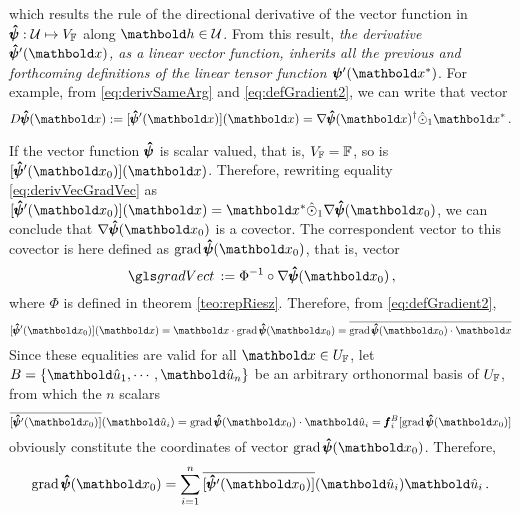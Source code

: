 which results the rule of the directional derivative of the vector function in $\pmb{\hat\psi} : \mathcal{U} \mapsto V_{\mathbb{F}}$ along $\vto{h}\in\mathcal{U}$. From this result, \emph{the derivative $\tnr{\hat\psi}'(\vto{x})$, as a linear vector function, inherits all the previous and forthcoming definitions of the linear tensor function $\fua{\tnr{\psi}'}{\vto{x}^*}$}. For example, from \eqref{eq:derivSameArg} and \eqref{eq:defGradient2}, we can write that vector
\begin{equation}\label{eq:derivSameArg2}
\fua{D\tnr{\hat\psi}}{\vto{x}} := \fua{[\tnr{\hat\psi}'(\vto{x})]}{\vto{x}}=\fua{ \nabla\tnr{\hat{\psi}}}{\vto{x}}^\dagger\hat{\odot}_1\vto{x}^*\,.
\end{equation}


If the vector function $\pmb{\hat\psi}$ is scalar valued, that is, $V_{\mathbb{F}}=\mathbb{F}$, so is $\fua{[\tnr{\hat\psi}'(\vto{x}_0)]}{\vto{x}}$. Therefore, rewriting equality \eqref{eq:derivVecGradVec} as $\fua{[\tnr{\hat\psi}'(\vto{x}_0)]}{\vto{x}} = \vto{x}^*\hat{\odot}_1\fua{ \nabla\tnr{\hat{\psi}}}{\vto{x}_0}$, we can conclude that $\fua{\nabla\tnr{\hat{\psi}}}{\vto{x}_0}$ is a covector. The correspondent vector to this covector is here defined as $\fua{\grad{\tnr{\hat{\psi}}}}{\vto{x}_0}$, that is, vector      
\begin{equation}
\gloref{gradVect}:=\Phi^{-1}\circ\fua{\nabla\tnr{\hat{\psi}}}{\vto{x}_0}\,,
\end{equation}
where $\Phi$ is defined in theorem \ref{teo:repRiesz}. Therefore, from \eqref{eq:defGradient2},
\begin{equation}\label{eq:gradScalVectFunc}
\fua{[\tnr{\hat\psi}'(\vto{x}_0)]}{\vto{x}} = \vto{x}\cdot\fua{\grad{\tnr{\hat{\psi}}}}{\vto{x}_0}=\overline{\fua{\grad{\tnr{\hat{\psi}}}}{\vto{x}_0}\cdot\vto{x}}
\end{equation}
Since these equalities are valid for all $\vto{x}\in U_\cam{F}$, let $B=\{\vun{u}_1,\cdots,\vun{u}_n\}$ be an arbitrary orthonormal basis of $U_{\mathbb{F}}$, from which the $n$ scalars
\begin{equation*}
\fua{\overline{[\tnr{\hat\psi}'(\vto{x}_0)]}}{\vun{u}_i} = \fua{\grad{\tnr{\hat{\psi}}}}{\vto{x}_0}\cdot\vun{u}_i=\vtf{f}_i^{B}[\fua{\grad{\tnr{\hat{\psi}}}}{\vto{x}_0}]
\end{equation*}
obviously constitute the coordinates of vector $\fua{\grad{\tnr{\hat{\psi}}}}{\vto{x}_0}$. Therefore, 
\begin{equation}
\fua{\grad{\tnr{\hat{\psi}}}}{\vto{x}_0} = \sum_{i=1}^n\fua{\overline{[\tnr{\hat\psi}'(\vto{x}_0)]}}{\vun{u}_i}\vun{u}_i\,.
\end{equation}
